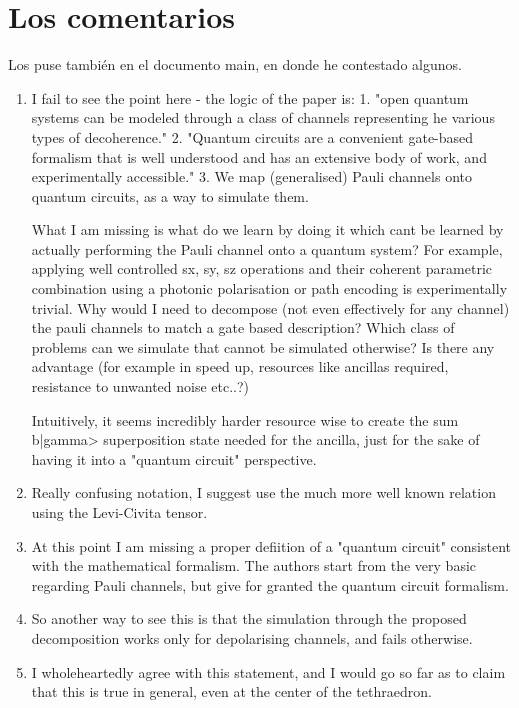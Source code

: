 \documentclass[10pt,letterpaper]{article} %
\begin{document}
\newpage
\section{Los comentarios}
Los puse también en el documento main, en donde he contestado algunos.


\begin{enumerate}
\item I fail to see the point here - the logic of the paper is: 
1. "open quantum systems can be modeled through a class of channels representing he various types of decoherence." 2. "Quantum circuits are a convenient gate-based formalism that is well understood and has an extensive body of work, and experimentally accessible."
3. We map (generalised) Pauli channels onto quantum circuits, as a way to simulate them.

What I am missing is what do we learn by doing it which cant be learned by actually performing the Pauli channel onto a quantum system? For example, applying well controlled sx, sy, sz operations and their coherent parametric combination using a photonic polarisation or path encoding is experimentally trivial. Why would I need to decompose (not even effectively for any channel) the pauli channels to match a gate based description? Which class of problems can we simulate that cannot be simulated otherwise? Is there any advantage (for example in speed up, resources like ancillas required, resistance to unwanted noise etc..?)

Intuitively, it seems incredibly harder resource wise to create the sum b|gamma> superposition state needed for the ancilla, just for the sake of having it into a "quantum circuit" perspective.

\item Really confusing notation, I suggest use the much more well known relation using the Levi-Civita tensor.

\item At this point I am missing a proper defiition of a "quantum circuit" consistent with the mathematical formalism. The authors start from the very basic regarding Pauli channels, but give for granted the quantum circuit formalism.

\item So another way to see this is that the simulation through the proposed decomposition works only for depolarising channels, and fails otherwise. 

\item I wholeheartedly agree with this statement, and I would go so far as to claim that this is true in general, even at the center of the tethraedron. \\


\end{enumerate}
\end{document}
